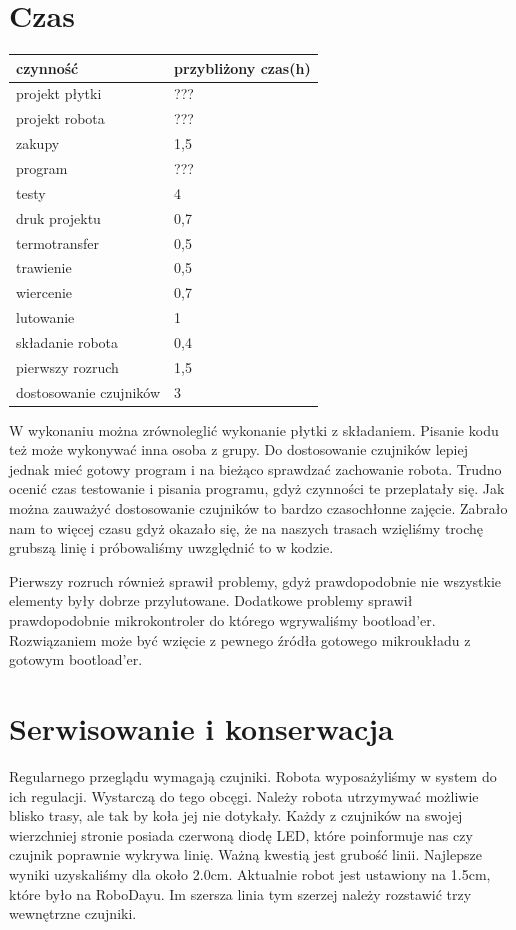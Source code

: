 \documentclass[a4paper,11pt]{article}
\begin{document}
\section{Czas}
\begin{center}


	\begin{tabular}{|l|l|}
		\hline
		czynność				& przybliżony czas(h)		\\ \hline
		projekt płytki			& ???						\\
		projekt robota			& ???						\\
		zakupy					& 1,5						\\
		program					& ???						\\
		testy					& 4							\\
		druk projektu			& 0,7						\\
		termotransfer			& 0,5						\\
		trawienie				& 0,5						\\
		wiercenie				& 0,7						\\
		lutowanie				& 1							\\
		składanie robota			& 0,4						\\
		pierwszy rozruch			& 1,5						\\
		dostosowanie czujników	& 3							\\

		\hline
	\end{tabular}
\end{center}
W wykonaniu można zrównoleglić  wykonanie płytki z składaniem. Pisanie kodu też może wykonywać inna osoba z grupy. Do dostosowanie czujników lepiej jednak mieć gotowy program i na bieżąco sprawdzać zachowanie robota.
Trudno ocenić czas testowanie i pisania programu, gdyż czynności te przeplatały się.
Jak można zauważyć dostosowanie czujników to bardzo czasochłonne zajęcie. Zabrało nam to więcej czasu gdyż okazało się, że na naszych trasach wzięliśmy trochę grubszą linię i próbowaliśmy uwzględnić to w kodzie.

Pierwszy rozruch również sprawił problemy, gdyż prawdopodobnie nie wszystkie elementy były dobrze przylutowane. Dodatkowe problemy sprawił prawdopodobnie mikrokontroler do którego wgrywaliśmy bootload'er. Rozwiązaniem może być wzięcie z pewnego źródła gotowego mikroukładu z gotowym bootload'er.
\section{Serwisowanie i konserwacja}
Regularnego przeglądu wymagają czujniki. Robota wyposażyliśmy w system do ich regulacji. Wystarczą do tego obcęgi. Należy robota utrzymywać możliwie blisko trasy, ale tak by koła jej nie dotykały. Każdy z czujników na swojej wierzchniej stronie posiada czerwoną diodę LED, które poinformuje nas czy czujnik poprawnie wykrywa linię. Ważną kwestią jest grubość linii. Najlepsze wyniki uzyskaliśmy dla około 2.0cm. Aktualnie robot jest ustawiony na 1.5cm, które było na RoboDayu. Im szersza linia tym szerzej należy rozstawić trzy wewnętrzne czujniki.
\end{document}
